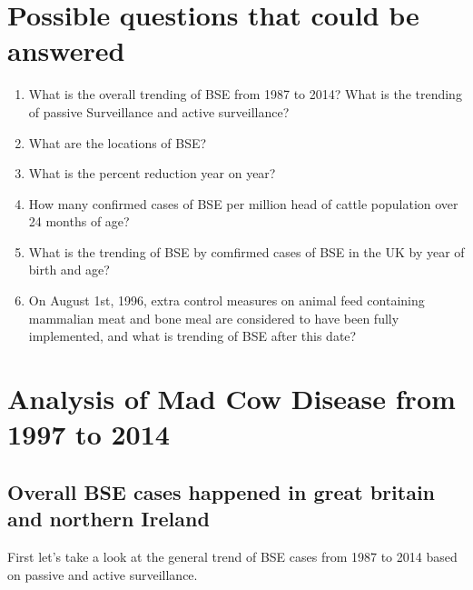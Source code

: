 \documentclass{article}\usepackage[]{graphicx}\usepackage[]{color}
\begin{document}
\section{Possible questions that could be answered}
\begin{enumerate}
\item What is the overall trending of BSE from 1987 to 2014? What is the trending of passive Surveillance and active surveillance?
\item What are the locations of BSE?
\item What is the percent reduction year on year?
\item How many confirmed cases of BSE per million head of cattle population over 24 months of age?
\item What is the trending of BSE by comfirmed cases of BSE in the UK by year of birth and age?
\item On August 1st, 1996, extra control measures on animal feed containing mammalian meat and bone meal are considered to have been fully implemented, and what is trending of BSE after this date?
\end{enumerate}

\section{Analysis of Mad Cow Disease from 1997 to 2014}
\subsection{Overall BSE cases happened in great britain and northern Ireland}

First let's take a look at the general trend of BSE cases from 1987 to 2014 based on passive and active surveillance.
\end{document}
